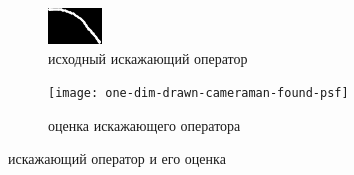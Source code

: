 \begin{figure}[h!]
	\centering
	\begin{subfigure}[b]{0.4\textwidth}
		\centering
		\includegraphics[width=\linewidth]{../input/drawn-psf3}
		\caption{исходный искажающий оператор}
		\label{fig:drawnPsf3-2}
	\end{subfigure}
	\begin{subfigure}[b]{0.4\textwidth}
		\centering
		\texttt{[image: one-dim-drawn-cameraman-found-psf]}
		\caption{оценка искажающего оператора}
	\end{subfigure}
	\caption{искажающий оператор и его оценка}
\end{figure}

